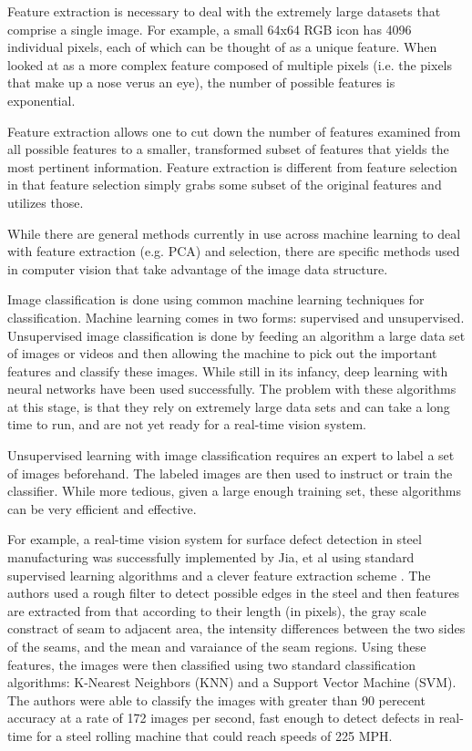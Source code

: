 \documentclass[letterpaper, 10 pt, conference]{ieeeconf}  %
\begin{document}
Feature extraction is necessary to deal with the extremely large datasets that comprise a single image.  For example, a small 64x64 RGB icon has 4096 individual pixels, each of which can be thought of as a unique feature. When looked at as a more complex feature composed of multiple pixels (i.e. the pixels that make up a nose verus an eye), the number of possible features is exponential. 

Feature extraction allows one to cut down the number of features examined from all possible features to a smaller, transformed subset of features that yields the most pertinent information. Feature extraction is different from feature selection in that feature selection simply grabs some subset of the original features and utilizes those.

While there are general methods currently in use across machine learning to deal with feature extraction (e.g. PCA) and selection, there are specific methods used in computer vision that take advantage of the image data structure.

Image classification is done using common machine learning techniques for classification. Machine learning comes in two forms: supervised and unsupervised. Unsupervised image classification is done by feeding an algorithm a large data set of images or videos and then allowing the machine to pick out the important features and classify these images. While still in its infancy, deep learning with neural networks have been used successfully. The problem with these algorithms at this stage, is that they rely on extremely large data sets and can take a long time to run, and are not yet ready for a real-time vision system. 

Unsupervised learning with image classification requires an expert to label a set of images beforehand. The labeled images are then used to instruct or train the classifier. While more tedious, given a large enough training set, these algorithms can be very efficient and effective.

For example, a real-time vision system for surface defect detection in steel manufacturing was successfully implemented by Jia, et al using standard supervised learning algorithms and a clever feature extraction scheme \cite{steelDefect}. The authors used a rough filter to detect possible edges in the steel and then features are extracted from that according to their length (in pixels), the gray scale constract of seam to adjacent area, the intensity differences between the two sides of the seams, and the mean and varaiance of the seam regions. Using these features, the images were then classified using two standard classification algorithms: K-Nearest Neighbors (KNN) and a Support Vector Machine (SVM). The authors were able to classify the images with greater than 90 perecent accuracy at a rate of 172 images per second, fast enough to detect defects in real-time for a steel rolling machine that could reach speeds of 225 MPH.
\end{document}
